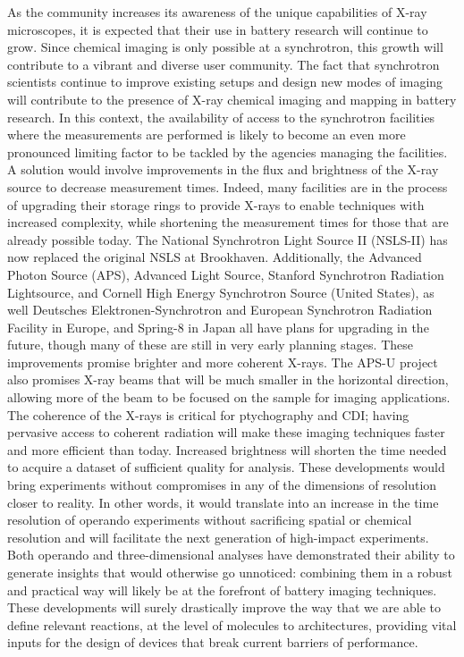 \documentclass[journal=cmatex,manuscript=perspective]{achemso}
\begin{document}
As the community increases its awareness of the unique capabilities of
X-ray microscopes, it is expected that their use in battery research
will continue to grow. Since chemical imaging is only possible at a
synchrotron, this growth will contribute to a vibrant and diverse user
community. The fact that synchrotron scientists continue to improve
existing setups and design new modes of imaging will contribute to the
presence of X-ray chemical imaging and mapping in battery research. In
this context, the availability of access to the synchrotron facilities
where the measurements are performed is likely to become an even more
pronounced limiting factor to be tackled by the agencies managing the
facilities. A solution would involve improvements in the flux and
brightness of the X-ray source to decrease measurement times. Indeed,
many facilities are in the process of upgrading their storage rings to
provide X-rays to enable techniques with increased complexity, while
shortening the measurement times for those that are already possible
today. The National Synchrotron Light Source II (NSLS-II) has now
replaced the original NSLS at Brookhaven. Additionally, the Advanced
Photon Source (APS), Advanced Light Source, Stanford Synchrotron
Radiation Lightsource, and Cornell High Energy Synchrotron Source
(United States), as well Deutsches Elektronen-Synchrotron and European
Synchrotron Radiation Facility in Europe, and Spring-8 in Japan all
have plans for upgrading in the future, though many of these are still
in very early planning stages. These improvements promise brighter and
more coherent X-rays. The APS-U project also promises X-ray beams that
will be much smaller in the horizontal direction, allowing more of the
beam to be focused on the sample for imaging applications. The
coherence of the X-rays is critical for ptychography and CDI; having
pervasive access to coherent radiation will make these imaging
techniques faster and more efficient than today. Increased brightness
will shorten the time needed to acquire a dataset of sufficient
quality for analysis. These developments would bring experiments
without compromises in any of the dimensions of resolution closer to
reality. In other words, it would translate into an increase in the
time resolution of operando experiments without sacrificing spatial or
chemical resolution and will facilitate the next generation of
high-impact experiments. Both operando and three-dimensional analyses
have demonstrated their ability to generate insights that would
otherwise go unnoticed: combining them in a robust and practical way
will likely be at the forefront of battery imaging techniques. These
developments will surely drastically improve the way that we are able
to define relevant reactions, at the level of molecules to
architectures, providing vital inputs for the design of devices that
break current barriers of performance.
\end{document}
